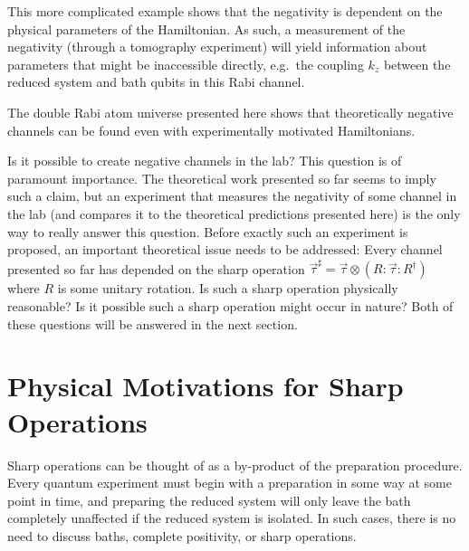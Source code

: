 This more complicated example shows that the negativity is dependent on the physical parameters of the Hamiltonian.  As such, a measurement of the negativity (through a tomography experiment) will yield information about parameters that might be inaccessible directly, e.g.\ the coupling $k_z$ between the reduced system and bath qubits in this Rabi channel.
 
The double Rabi atom universe presented here shows that theoretically negative channels can be found even with experimentally motivated Hamiltonians.  

Is it possible to create negative channels in the lab?  This question is of paramount importance.  The theoretical work presented so far seems to imply such a claim, but an experiment that measures the negativity of some channel in the lab (and compares it to the theoretical predictions presented here) is the only way to really answer this question.  Before exactly such an experiment is proposed, an important theoretical issue needs to be addressed:  Every channel presented so far has depended on the sharp operation $\vec{\tau}^\sharp=\vec{\tau}\otimes\left(R:\vec{\tau}:R^\dagger\right)$ where $R$ is some unitary rotation.  Is such a sharp operation physically reasonable?  Is it possible such a sharp operation might occur in nature?  Both of these questions will be answered in the next section.


\chapter{Physical Motivations for Sharp Operations}
\label{sec:sharp}

Sharp operations can be thought of as a by-product of the preparation procedure.  Every quantum experiment must begin with a preparation in some way at some point in time, and preparing the reduced system will only leave the bath completely unaffected if the reduced system is isolated.  In such cases, there is no need to discuss baths, complete positivity, or sharp operations.

